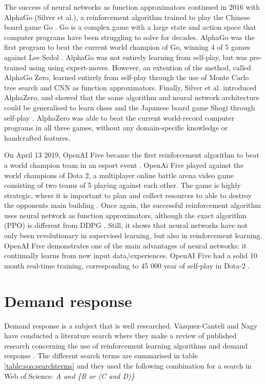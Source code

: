 \documentclass[class=book, crop=false]{standalone}
\begin{document}
The success of neural networks as function approximators continued in 2016 with AlphaGo (Silver et al.), a reinforcement algorithm trained to play the Chinese board game Go \cite{alphago}. Go is a complex game with a large state and action space that computer programs have been struggling to solve for decades. AlphaGo was the first program to beat the current world champion of Go, winning 4 of 5 games against Lee Sedol \cite{Sutton1998}. AlphaGo was not entirely learning from self-play, but was pre-trained using using expert-moves. However, an extention of the method, called AlphaGo Zero, learned entirely from self-play through the use of Monte Carlo tree search and CNN as function approximators. Finally,  Silver et al. introduced AlphaZero, and showed that the same algorithm and neural network architecture could be generalised to learn chess and the Japanese board game Shogi through self-play \cite{alphazero}. AlphaZero was able to beat the current world-record computer programs in all three games, without any domain-specific knowledge or handcrafted features. 

On April 13 2019, OpenAI Five became the first reinforcement algorithm to beat a world champion team in an esport event \cite{openai_dota}. OpenAi Five played against the world champions of Dota 2, a multiplayer online battle arena video game consisting of two teams of 5 playing against each other. The game is highly strategic, where it is important to plan and collect resources to able to destroy the opponents main building \cite{dota_wiki}. Once again, the successful reinforcement algorithm uses neural network as function approximators, although the exact algorithm (PPO) is different from DDPG \cite{PPO_openAI_Schulman}. Still, it shows that neural networks have not only been revolutionary in supervised learning, but also in reinforcement learning. OpenAI Five demonstrates one of the main advantages of neural networks: it continually learns from new input data/experiences. OpenAI Five had a solid 10 month real-time training, corresponding to 45 000 year of self-play in Dota-2 \cite{openai_dota}.


\section{Demand response}
Demand response is a subject that is well researched. Vázquez-Canteli and Nagy have conducted a literature search where they make a review of published research concerning the use of reinforcement learning algorithms and demand response \cite{vazquez2019reinforcement}. The different search terms are summarised in table \ref{table:soa:searchterms} and they used the following combination for a search in  Web of Science: \textit{A and \{B or (C and D)\}}
\end{document}
